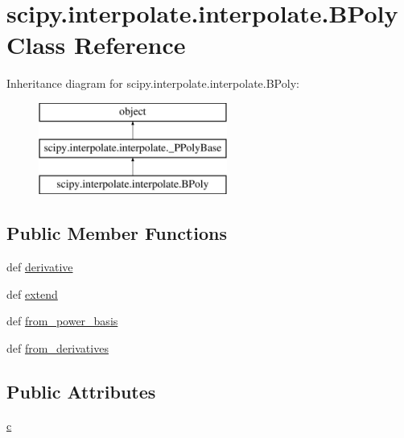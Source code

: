 \hypertarget{classscipy_1_1interpolate_1_1interpolate_1_1BPoly}{}\section{scipy.\+interpolate.\+interpolate.\+B\+Poly Class Reference}
\label{classscipy_1_1interpolate_1_1interpolate_1_1BPoly}
Inheritance diagram for scipy.\+interpolate.\+interpolate.\+B\+Poly\+:\begin{figure}[H]
\begin{center}
\leavevmode
\includegraphics[height=3.000000cm]{classscipy_1_1interpolate_1_1interpolate_1_1BPoly}
\end{center}
\end{figure}
\subsection*{Public Member Functions}
\begin{DoxyCompactItemize}
\item 
def \hyperlink{classscipy_1_1interpolate_1_1interpolate_1_1BPoly_abc27e1308d1cf3fb08f38f9609e879c3}{derivative}
\item 
def \hyperlink{classscipy_1_1interpolate_1_1interpolate_1_1BPoly_aa1dbd85d71064dc76ea1b4811ef4c9f0}{extend}
\item 
def \hyperlink{classscipy_1_1interpolate_1_1interpolate_1_1BPoly_a0683dfe63a9a80e23c2bfe216f829afc}{from\+\_\+power\+\_\+basis}
\item 
def \hyperlink{classscipy_1_1interpolate_1_1interpolate_1_1BPoly_a4a5efe190facaef81eb5aa445244563e}{from\+\_\+derivatives}
\end{DoxyCompactItemize}
\subsection*{Public Attributes}
\begin{DoxyCompactItemize}
\item 
\hyperlink{classscipy_1_1interpolate_1_1interpolate_1_1BPoly_a3adf7285134e6b463b179f10df120786}{c}
\end{DoxyCompactItemize}


